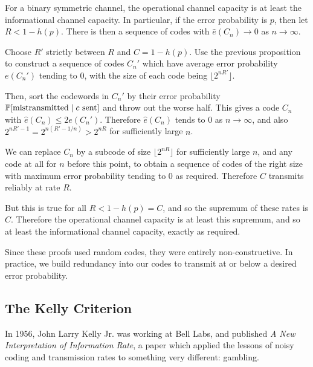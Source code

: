 \documentclass{article}
\begin{document}
\begin{proposition}
    For a binary symmetric channel, the operational channel capacity is at least the informational channel capacity.
    In particular, if the error probability is $p$, then let $R < 1 - h(p)$.
    There is then a sequence of codes with $\hat e(C_n) \to 0$ as $n \to \infty$.
\end{proposition}
\begin{prf}
    Choose $R'$ strictly between $R$ and $C = 1 - h(p)$.
    Use the previous proposition to construct a sequence of codes $C_n'$
    which have average error probability $e(C_n')$ tending to 0,
    with the size of each code being $\lfloor 2^{nR'} \rfloor$.
    
    Then, sort the codewords in $C_n'$ by their error probability
    $\P[\text{mistransmitted} \mid c \text{ sent}]$
    and throw out the worse half.
    This gives a code $C_n$ with $\hat e(C_n) \leq 2e(C_n')$.
    Therefore $\hat e(C_n)$ tends to 0 as $n \to \infty$,
    and also $2^{nR'-1} = 2^{n(R' - 1/n)} > 2^{nR}$ for sufficiently large $n$.
    
    We can replace $C_n$ by a subcode of size $\lfloor 2^{nR} \rfloor$
    for sufficiently large $n$, and any code at all for $n$ before this point,
    to obtain a sequence of codes of the right size
    with maximum error probability tending to 0 as required.
    Therefore $C$ transmits reliably at rate $R$.
    
    But this is true for all $R < 1 - h(p) = C$,
    and so the supremum of these rates is $C$.
    Therefore the operational channel capacity is at least this supremum,
    and so at least the informational channel capacity, exactly as required.
\end{prf}

\begin{note}
	Since these proofs used random codes, they were entirely non-constructive. In practice, we build redundancy into our codes to transmit at or below a desired error probability.
\end{note}

\subsection{The Kelly Criterion}

In 1956, John Larry Kelly Jr. was working at Bell Labs, and published \textit{A New Interpretation of Information Rate}, a paper which applied the lessons of noisy coding and transmission rates to something very different: gambling.
\end{document}
